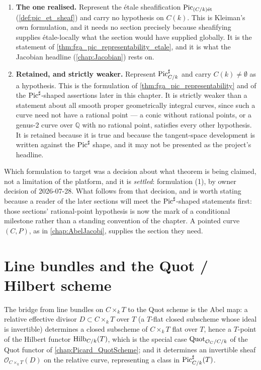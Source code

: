\begin{enumerate}
  \item \textbf{The one realised.} Represent the \'etale sheafification
    \(\operatorname{Pic}_{(C/k)\mathrm{\acute{e}t}}\) (\cref{def:pic_et_sheaf}) and carry no hypothesis on
    \(C(k)\). This is Kleiman's own formulation, and it needs no section
    precisely because sheafifying supplies \'etale-locally what the section
    would have supplied globally. It is the statement of
    \cref{thm:fga_pic_representability_etale}, and it is what the Jacobian
    headline (\cref{chap:Jacobian}) rests on.
  \item \textbf{Retained, and strictly weaker.} Represent
    \(\operatorname{Pic}^\sharp_{C/k}\) and carry \(C(k) \neq \emptyset\) as a hypothesis.
    This is the formulation of \cref{thm:fga_pic_representability} and of the
    \(\operatorname{Pic}^\sharp\)-shaped assertions later in this chapter. It is strictly
    weaker than a statement about all smooth proper geometrically integral
    curves, since such a curve need not have a rational point --- a conic
    without rational points, or a genus-\(2\) curve over \(\mathbb{Q}\) with no
    rational point, satisfies every other hypothesis. It is retained because it
    is true and because the tangent-space development is written against the
    \(\operatorname{Pic}^\sharp\) shape, and it may not be presented as the project's
    headline.
\end{enumerate}

Which formulation to target was a decision about what theorem is being claimed,
not a limitation of the platform, and it is \emph{settled}: formulation (1), by
owner decision of 2026-07-28. What follows from that decision, and is worth
stating because a reader of the later sections will meet the
\(\operatorname{Pic}^\sharp\)-shaped statements first: those sections' rational-point
hypothesis is now the mark of a conditional milestone rather than a standing
convention of the chapter. A pointed curve \((C,P)\), as in
\cref{chap:AbelJacobi}, supplies the section they need.


\section{Line bundles and the Quot / Hilbert scheme}
\label{sec:fga_pic_line_bundle_quot}

The bridge from line bundles on \(C \times_k T\) to the Quot scheme is the
Abel map: a relative effective divisor \(D \subset C \times_k T\) over \(T\)
(a \(T\)-flat closed subscheme whose ideal is invertible) determines a closed
subscheme of \(C \times_k T\) flat over \(T\), hence a \(T\)-point of the Hilbert
functor \(\operatorname{Hilb}_{C/k}(T)\), which is the special case \(\operatorname{Quot}_{\mathcal{O}_C/C/k}\)
of the Quot functor of \cref{chap:Picard_QuotScheme}; and it determines an
invertible sheaf \(\mathcal{O}_{C \times_k T}(D)\) on the relative curve,
representing a class in \(\operatorname{Pic}^\sharp_{C/k}(T)\).

